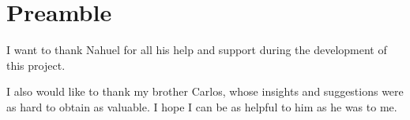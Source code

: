 
\chapter*{Preamble}
\thispagestyle{empty}


\thispagestyle{empty}
\vspace{1cm}

I want to thank Nahuel for all his help and support during the development of
this project.

I also would like to thank my brother Carlos, whose insights and suggestions
were as hard to obtain as valuable. I hope I can be as helpful to him as he was
to me.

\cleardoublepage%

